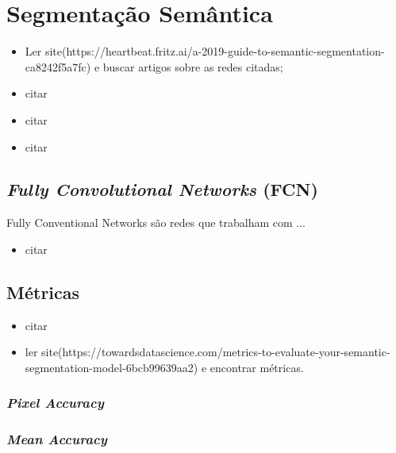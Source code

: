 \newpage
\section{Segmentação Semântica}
\label{semantic:semantic}
\begin{itemize}
    \item Ler site(https://heartbeat.fritz.ai/a-2019-guide-to-semantic-segmentation-ca8242f5a7fc) e buscar artigos sobre as redes citadas;
    \item citar \cite{Minaee2021}
    \item citar \cite{Arbelaez2012}
    \item citar \cite{Zhang2018}
\end{itemize}


\subsection{\textit{Fully Convolutional Networks} (FCN)}
\label{semantic:FCN}
Fully Conventional Networks são redes que trabalham com ... 
\begin{itemize}
    \item citar \cite{Shelhamer2016}
\end{itemize}


\subsection{Métricas}
\begin{itemize}
    \item citar \cite{Csurka}
    \item ler site(https://towardsdatascience.com/metrics-to-evaluate-your-semantic-segmentation-model-6bcb99639aa2) e encontrar métricas.
\end{itemize}
\subsubsection{\textit{Pixel Accuracy}}
\subsubsection{\textit{Mean Accuracy}}
